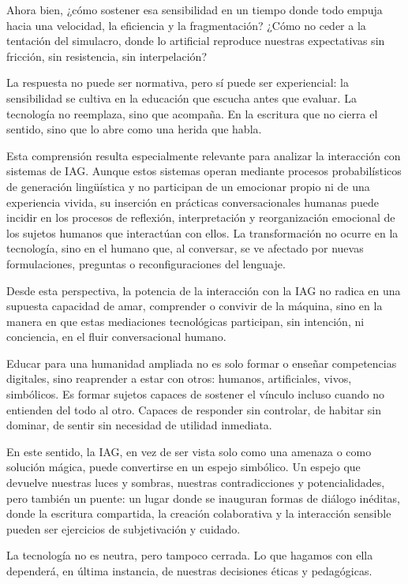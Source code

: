 \documentclass[spanish]{textolivre}
\begin{document}
Ahora bien, ¿cómo sostener esa sensibilidad en un tiempo donde todo empuja hacia una velocidad, la eficiencia y la fragmentación? ¿Cómo no ceder a la tentación del simulacro, donde lo artificial reproduce nuestras expectativas sin fricción, sin resistencia, sin interpelación?

La respuesta no puede ser normativa, pero sí puede ser experiencial: la sensibilidad se cultiva en la educación que escucha antes que evaluar. La tecnología no reemplaza, sino que acompaña. En la escritura que no cierra el sentido, sino que lo abre como una herida que habla.

Esta comprensión resulta especialmente relevante para analizar la interacción con sistemas de IAG. Aunque estos sistemas operan mediante procesos probabilísticos de generación lingüística y no participan de un emocionar propio ni de una experiencia vivida, su inserción en prácticas conversacionales humanas puede incidir en los procesos de reflexión, interpretación y reorganización emocional de los sujetos humanos que interactúan con ellos. La transformación no ocurre en la tecnología, sino en el humano que, al conversar, se ve afectado por nuevas formulaciones, preguntas o reconfiguraciones del lenguaje.

Desde esta perspectiva, la potencia de la interacción con la IAG no radica en una supuesta capacidad de amar, comprender o convivir de la máquina, sino en la manera en que estas mediaciones tecnológicas participan, sin intención, ni conciencia, en el fluir conversacional humano.

Educar para una humanidad ampliada no es solo formar o enseñar competencias digitales, sino reaprender a estar con otros: humanos, artificiales, vivos, simbólicos. Es formar sujetos capaces de sostener el vínculo incluso cuando no entienden del todo al otro. Capaces de responder sin controlar, de habitar sin dominar, de sentir sin necesidad de utilidad inmediata.

En este sentido, la IAG, en vez de ser vista solo como una amenaza o como solución mágica, puede convertirse en un espejo simbólico. Un espejo que devuelve nuestras luces y sombras, nuestras contradicciones y potencialidades, pero también un puente: un lugar donde se inauguran formas de diálogo inéditas, donde la escritura compartida, la creación colaborativa y la interacción sensible pueden ser ejercicios de subjetivación y cuidado.

La tecnología no es neutra, pero tampoco cerrada. Lo que hagamos con ella dependerá, en última instancia, de nuestras decisiones éticas y pedagógicas. 
\end{document}
